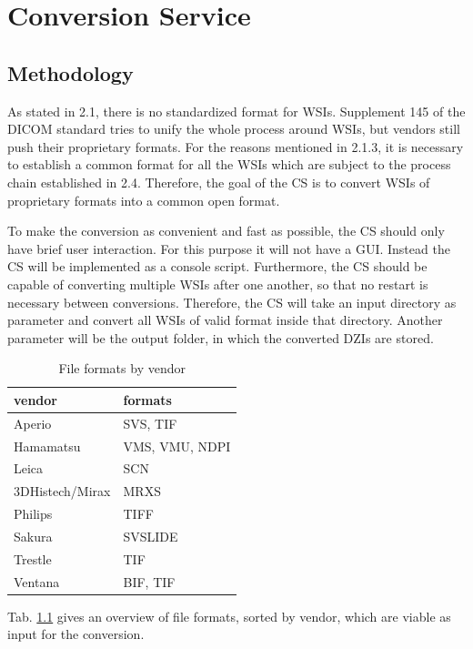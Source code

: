 \chapter{Conversion Service}

\section{Methodology}
As stated in 2.1, there is no standardized format for WSIs. Supplement 145 of the DICOM standard tries to unify the whole process around WSIs, but vendors still push their proprietary formats. For the reasons mentioned in 2.1.3, it is necessary to establish a common format for all the WSIs which are subject to the process chain established in 2.4. Therefore, the goal of the CS is to convert WSIs of proprietary formats into a common open format.

To make the conversion as convenient and fast as possible, the CS should only have brief user interaction. For this purpose it will not have a GUI. Instead the CS will be implemented as a console script. Furthermore, the CS should be capable of converting multiple WSIs after one another, so that no restart is necessary between conversions. Therefore, the CS will take an input directory as parameter and convert all WSIs of valid format inside that directory. Another parameter will be the output folder, in which the converted DZIs are stored.

\begin{table}[H]
	\begin{center}
		\begin{tabular}{| l | l |}
			\hline
			\textbf{vendor} & \textbf{formats}\\ \hline
			Aperio & SVS, TIF\\ \hline
			Hamamatsu & VMS, VMU, NDPI\\ \hline
			Leica & SCN\\ \hline
			3DHistech/Mirax & MRXS\\ \hline
			Philips & TIFF\\ \hline
			Sakura & SVSLIDE\\ \hline
			Trestle & TIF\\ \hline
			Ventana & BIF, TIF\\ \hline
		\end{tabular}
		\caption{File formats by vendor}
		\label{tab3.1}
	\end{center}
\end{table}

Tab. \ref{tab3.1} gives an overview of file formats, sorted by vendor, which are viable as input for the conversion.



